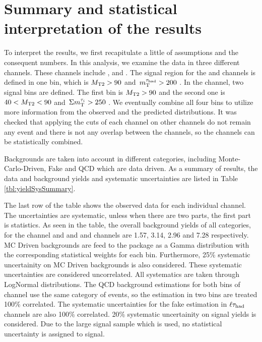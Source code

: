 \section{Summary and statistical interpretation of the results}
\label{sect:stat}
To interpret the results, we first recapitulate a little of assumptions and the consequent numbers.
In this analysis, we examine the data in three different channels.
These channels include \tauTau, \muTau and \eTau.
The signal region for the \muTau and \eTau channels is defined in one bin, which is ${M_{\rm T2}} > 90$ \GeV and $\,m_{\rm T}^{\tau_{\rm had}} > 200$ \GeV.
In the \tauTau channel, two signal bins are defined.
The first bin is ${M_{\rm T2}} > 90$ \GeV and the second one is $40 < {M_{\rm T2}} < 90$ \GeV and $\,\Sigma m_{\rm T}^{\tau_i} > 250$ \GeV.
We eventually combine all four bins to utilize more information from the observed and the predicted distributions.
It was checked that applying the cuts of each channel on other channels do not remain any event and 
there is not any overlap between the channels, so the channels can be statistically combined.


Backgrounds are taken into account in different categories, including Monte-Carlo-Driven, Fake and QCD which are data driven.
As a summary of results, the data and background yields and systematic uncertainties are listed in Table \ref{tbl:yieldSysSummary}. 

The last row of the table shows the observed data for  each individual channel.  The uncertainties are systematic, unless when there are 
two parts, the first part is statistics.
As seen in the table, the overall background yields of all categories, 
for the \tauTau channel \binone and \bintwo and \eTau and \muTau channels are  
1.57, 3.14, 2.96 and 7.28 respectively.
MC Driven backgrounds are feed to the package as a Gamma distribution with the corresponding statistical weights for each bin.
Furthermore, 25\% systematic uncertainity on MC Driven backgrounds is also considered. These systematic uncertainties are considered uncorrelated.
All systematics are taken through LogNormal distributions. 
The QCD background estimations for 
both bins of \tauTau channel use the same category of events, so the estimation in two bins are treated 100\% correlated. 
The systematic uncertainties for the fake estimation in $\ell\tau_{\rm had}$ channels are also 100\% correlated. 
20\% systematic uncertainity on signal yields is considered. 
Due to the large signal sample which is used, no statistical uncertainty is assigned to signal.

